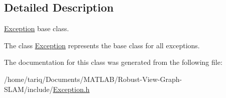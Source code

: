 \subsection{Detailed Description}
\hyperlink{classException}{Exception} base class. 

The class \hyperlink{classException}{Exception} represents the base class for all exceptions. 

The documentation for this class was generated from the following file\+:\begin{DoxyCompactItemize}
\item 
/home/tariq/\+Documents/\+M\+A\+T\+L\+A\+B/\+Robust-\/\+View-\/\+Graph-\/\+S\+L\+A\+M/include/\hyperlink{Exception_8h}{Exception.\+h}\end{DoxyCompactItemize}
